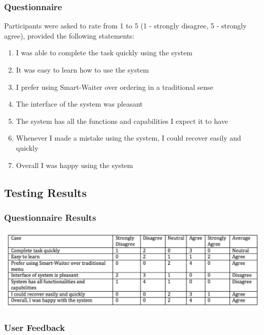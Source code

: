 \documentclass[12pt, titlepage]{article}
\begin{document}
\subsubsection{Questionnaire}
Participants were asked to rate from 1 to 5 (1 - strongly disagree, 5 - strongly agree), provided the following statements: 
\begin{enumerate}
\item  I was able to complete the task quickly using the system
\item It was easy to learn how to use the system
\item I prefer using Smart-Waiter over ordering in a traditional sense
\item The interface of the system was pleasant
\item The system has all the functions and capabilities I expect it to have
\item Whenever I made a mistake using the system, I could recover easily and quickly
\item Overall I was happy using the system
\end{enumerate} 

\subsection{Testing Results} 

\subsubsection{Questionnaire Results}

\includegraphics[width=1.2\textwidth]{usabilityResults.png}

\subsubsection{User Feedback}
\end{document}
